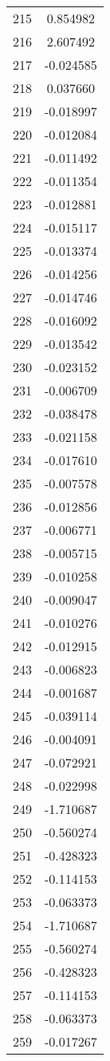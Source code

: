 \documentclass[12pt]{article}
\begin{document}
\begin{longtable}{@{}cc@{}}
215 & 0.854982 \\
216 & 2.607492 \\
217 & -0.024585 \\
218 & 0.037660 \\
219 & -0.018997 \\
220 & -0.012084 \\
221 & -0.011492 \\
222 & -0.011354 \\
223 & -0.012881 \\
224 & -0.015117 \\
225 & -0.013374 \\
226 & -0.014256 \\
227 & -0.014746 \\
228 & -0.016092 \\
229 & -0.013542 \\
230 & -0.023152 \\
231 & -0.006709 \\
232 & -0.038478 \\
233 & -0.021158 \\
234 & -0.017610 \\
235 & -0.007578 \\
236 & -0.012856 \\
237 & -0.006771 \\
238 & -0.005715 \\
239 & -0.010258 \\
240 & -0.009047 \\
241 & -0.010276 \\
242 & -0.012915 \\
243 & -0.006823 \\
244 & -0.001687 \\
245 & -0.039114 \\
246 & -0.004091 \\
247 & -0.072921 \\
248 & -0.022998 \\
249 & -1.710687 \\
250 & -0.560274 \\
251 & -0.428323 \\
252 & -0.114153 \\
253 & -0.063373 \\
254 & -1.710687 \\
255 & -0.560274 \\
256 & -0.428323 \\
257 & -0.114153 \\
258 & -0.063373 \\
259 & -0.017267 \\

\end{longtable}
\end{document}

